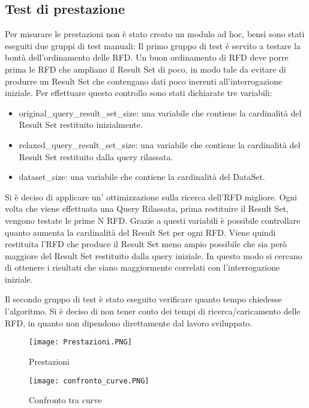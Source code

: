 \subsection{Test di prestazione}
Per misurare le prestazioni non è stato creato un modulo ad hoc, bensì sono stati eseguiti due gruppi di test manuali:
Il primo gruppo di test è servito a testare la bontà dell'ordinamento delle RFD. 
Un buon ordinamento di RFD deve porre prima le RFD che ampliano il Result Set di poco,
in modo tale da evitare di produrre un Result Set che contengano dati poco inerenti all'interrogazione iniziale.
Per effettuare questo controllo sono stati dichiarate tre variabili:
\begin{itemize}
    \item original{\_}query{\_}result{\_}set{\_}size: una variabile che contiene la cardinalità del Result Set restituito inizialmente.
    \item relaxed{\_}query{\_}result{\_}set{\_}size: una variabile che contiene la cardinalità del Result Set restituito dalla query rilassata.
    \item dataset{\_}size: una variabile che contiene la cardinalità del DataSet.
\end{itemize}
Si è deciso di applicare un' ottimizzazione sulla ricerca dell'RFD migliore. 
Ogni volta che viene effettuata una Query Rilassata, prima restituire il Result Set, vengono testate le prime N RFD.
Grazie a questi variabili è possibile controllare quanto aumenta la cardinalità del Result Set per ogni RFD. Viene quindi restituita l'RFD che produce il Result Set meno ampio possibile che sia però maggiore del Result Set restituito dalla query iniziale. In questo modo si cercano di ottenere i risultati che siano maggiormente correlati con l'interrogazione iniziale.

Il secondo gruppo di test è stato eseguito verificare quanto tempo chiedesse l'algoritmo.
Si è deciso di non tener conto dei tempi di ricerca/caricamento delle RFD, in quanto non dipendono direttamente dal lavoro sviluppato.

\begin{figure}[H]
    \centering
    \texttt{[image: Prestazioni.PNG]}
    \caption{Prestazioni}
    \label{fig:prestazioni}
\end{figure}

\begin{figure}[H]
    \centering
    \texttt{[image: confronto\_curve.PNG]}
    \caption{Confronto tra curve}
    \label{fig:confronto_curve}
\end{figure}


